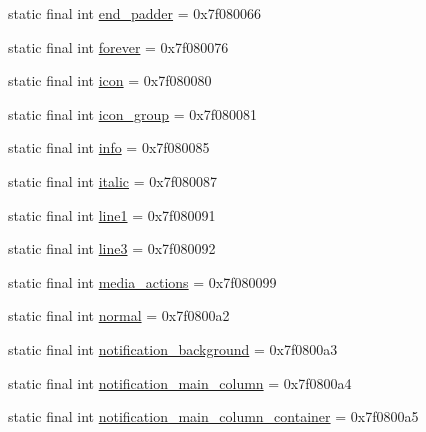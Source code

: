 \begin{DoxyCompactItemize}
\item 
static final int \mbox{\hyperlink{classandroid_1_1support_1_1mediacompat_1_1_r_1_1id_a724d5276dfd452a405d38a65c86bb16e}{end\+\_\+padder}} = 0x7f080066
\item 
static final int \mbox{\hyperlink{classandroid_1_1support_1_1mediacompat_1_1_r_1_1id_a13d4eb6350344f9be802fd9c7a777070}{forever}} = 0x7f080076
\item 
static final int \mbox{\hyperlink{classandroid_1_1support_1_1mediacompat_1_1_r_1_1id_a97f8ae23193f523cb3c7d80bd858c061}{icon}} = 0x7f080080
\item 
static final int \mbox{\hyperlink{classandroid_1_1support_1_1mediacompat_1_1_r_1_1id_afee11ff879519821d86ec29037255074}{icon\+\_\+group}} = 0x7f080081
\item 
static final int \mbox{\hyperlink{classandroid_1_1support_1_1mediacompat_1_1_r_1_1id_a1471ccc5ed7987163993f6802ad75c66}{info}} = 0x7f080085
\item 
static final int \mbox{\hyperlink{classandroid_1_1support_1_1mediacompat_1_1_r_1_1id_aeb3a83f4faf38671c6cc397b3e02c0fe}{italic}} = 0x7f080087
\item 
static final int \mbox{\hyperlink{classandroid_1_1support_1_1mediacompat_1_1_r_1_1id_a39818ea212eae5f5d5a732df62c05b5a}{line1}} = 0x7f080091
\item 
static final int \mbox{\hyperlink{classandroid_1_1support_1_1mediacompat_1_1_r_1_1id_a80a0afcb08dc0adf32e6243fcfd1bf15}{line3}} = 0x7f080092
\item 
static final int \mbox{\hyperlink{classandroid_1_1support_1_1mediacompat_1_1_r_1_1id_a71d790b5fc85a08667292c78fe432184}{media\+\_\+actions}} = 0x7f080099
\item 
static final int \mbox{\hyperlink{classandroid_1_1support_1_1mediacompat_1_1_r_1_1id_ab57d61231fc23a4009c6318e35a1c9a3}{normal}} = 0x7f0800a2
\item 
static final int \mbox{\hyperlink{classandroid_1_1support_1_1mediacompat_1_1_r_1_1id_a5c62145dcbaaac1a56ae8f5dd0c5ff27}{notification\+\_\+background}} = 0x7f0800a3
\item 
static final int \mbox{\hyperlink{classandroid_1_1support_1_1mediacompat_1_1_r_1_1id_a608aa023d413c7786a04081f541959a2}{notification\+\_\+main\+\_\+column}} = 0x7f0800a4
\item 
static final int \mbox{\hyperlink{classandroid_1_1support_1_1mediacompat_1_1_r_1_1id_aebb8765ed159bdfff53e490eab345578}{notification\+\_\+main\+\_\+column\+\_\+container}} = 0x7f0800a5
\item 

\end{DoxyCompactItemize}
